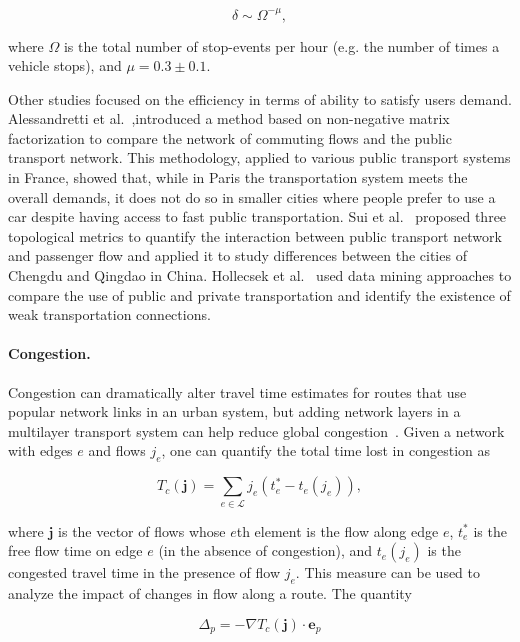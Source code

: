 \begin{equation}
   \delta \sim \Omega^{-\mu},
\end{equation}

where $\Omega$ is the total number of stop-events per hour (e.g. the number of times a vehicle stops), and $\mu = 0.3 \pm 0.1$.

Other studies focused on the efficiency in terms of ability to satisfy users demand. Alessandretti et al.~\cite{alessandretti2016user},introduced a method based on non-negative matrix factorization to compare the network of commuting flows and the public transport network. This methodology, applied to various public transport systems in France, showed that, while in Paris the transportation system meets the overall demands, it does not do so in smaller cities where people prefer to use a car despite having access to fast public transportation. Sui et al.~\cite{sui2019publictransport} proposed three topological metrics to quantify the interaction between public transport network and passenger flow and applied it to study differences between the cities of Chengdu and Qingdao in China. Hollecsek et al.~\cite{holleczek2014detecting} used data mining approaches to compare the use of public and private transportation and identify the existence of weak transportation connections.
 
\paragraph{Congestion.} 
Congestion can dramatically alter travel time estimates for routes that use popular network links in an urban system, but adding network layers in a multilayer transport system can help reduce global congestion~\cite{chodrow2016congestion}. Given a network with edges $e$ and flows $j_e$, one can quantify the total time lost in congestion as 

\begin{equation}
    T_c(\textbf{j})=\sum_{e\in \mathcal{L}}j_e(t_e^* - t_e(j_e)),
\end{equation}

where $\textbf{j}$ is the vector of flows whose $e$th element is the flow along edge $e$, $t_e^*$ is the free flow time on edge $e$ (in the absence of congestion), and $t_e(j_e)$ is the congested travel time in the presence of flow $j_e$. 
This measure can be used to analyze the impact of changes in flow along a route. The quantity

\begin{equation}
    \Delta_p = - \nabla T_c(\textbf{j}) \cdot \textbf{e}_p
\end{equation}


